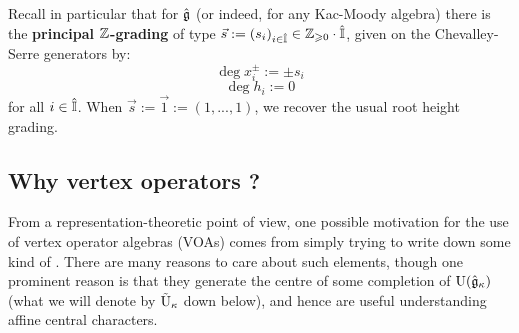         Recall in particular that for $\hat{\mathfrak{g}}$ (or indeed, for any Kac-Moody algebra) there is the \textbf{principal $\mathbb{Z}$-grading} of type $\vec{s} := (s_i)_{i \in \hat{\mathbb{I}}} \in \mathbb{Z}_{\geqslant 0} \cdot \hat{\mathbb{I}}$, given on the Chevalley-Serre generators by:
            $$\deg x_i^{\pm} := \pm s_i$$
            $$\deg h_i := 0$$
        for all $i \in \hat{\mathbb{I}}$. When $\vec{s} := \vec{1} := (1, ..., 1)$, we recover the usual root height grading. 

    \subsection{Why vertex operators ?}
        From a representation-theoretic point of view, one possible motivation for the use of vertex operator algebras (VOAs) comes from simply trying to write down some kind of . There are many reasons to care about such elements, though one prominent reason is that they generate the centre of some completion of $\mathrm{U}(\hat{\mathfrak{g}}_{\kappa})$ (what we will denote by $\tilde{\mathrm{U}}_{\kappa}$ down below), and hence are useful understanding affine central characters. 
        
